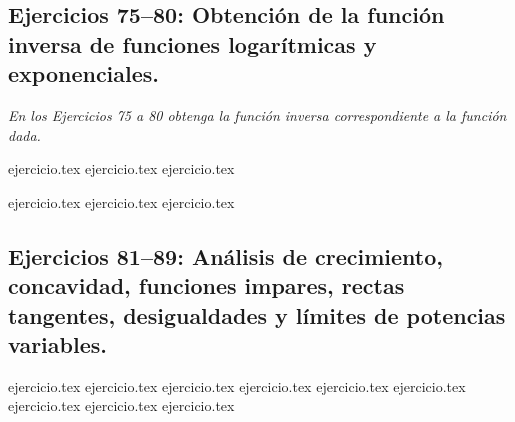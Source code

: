 \subsection*{Ejercicios 75--80: Obtención de la función inversa de funciones logarítmicas y exponenciales.}

\noindent \textit{En los Ejercicios 75 a 80 obtenga la función inversa correspondiente a la función dada.}

\begin{enumerate}
    \setcounter{enumi}{74}
    \begin{minipage}{0.45\textwidth}
    {ejercicio.tex}
    {ejercicio.tex}
    {ejercicio.tex}
    \end{minipage}%
    \begin{minipage}{0.45\textwidth}
    {ejercicio.tex}
    {ejercicio.tex}
    {ejercicio.tex}
    \end{minipage}
\end{enumerate}

\subsection*{Ejercicios 81--89: Análisis de crecimiento, concavidad, funciones impares, rectas tangentes, desigualdades y límites de potencias variables.}

\begin{enumerate}
    \setcounter{enumi}{80}
    {ejercicio.tex}
    {ejercicio.tex}
    {ejercicio.tex}
    {ejercicio.tex}
    {ejercicio.tex}
    {ejercicio.tex}
    {ejercicio.tex}
    {ejercicio.tex}
    {ejercicio.tex}
\end{enumerate}
